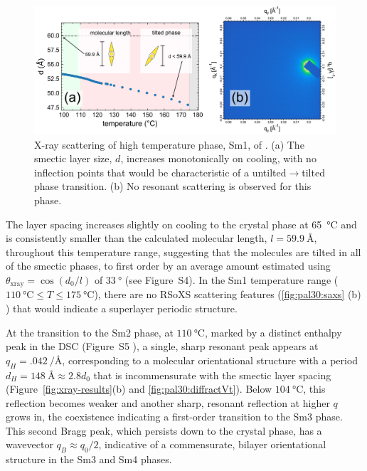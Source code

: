 \documentclass[aagreenthesis]{subfiles}
\begin{document}
\begin{figure}[h!]
    \centering
    \includegraphics[width=\textwidth]{figs/pal30/xraysm1/sm1-xray-annote.png}
    \caption{\label{fig:pal30:saxs} X-ray scattering of high temperature phase,
        Sm1, of \smcpalpha{}. (a) The smectic layer
    size, $d$, increases monotonically on cooling, with no inflection points
that would be characteristic of a untilted$\rightarrow$tilted phase transition.
(b) No resonant scattering is observed for this phase.}
\end{figure}


The layer spacing increases slightly on cooling
to the crystal phase at \SI{65}{\degreeCelsius} and is
consistently smaller than the calculated molecular length, $l = \SI{59.9}{\angstrom}$, throughout this temperature range, suggesting that the molecules are tilted in all of the smectic phases, to first order by an average amount estimated using $\theta_\textrm{xray} =
\cos(d_0/l)$ of $\SI{33}{\degree}$ (see Figure~S4).
In the Sm1 temperature range ($\SI{110}{\degreeCelsius} \leq T \leq
\SI{175}{\degreeCelsius}$), there are no RSoXS scattering features
(\autoref{fig:pal30:saxs} (b) ) that would indicate a
superlayer periodic structure.

At the transition to the Sm2 phase, at $\SI{110}{\degreeCelsius}$, marked  by
a distinct enthalpy peak in the DSC (Figure~S5
), a single, sharp
resonant peak appears at $q_H = \SI[per-mode=reciprocal]{.042}{\per\angstrom}$, corresponding
to a molecular orientational structure with a period
$d_H=\SI{148}{\angstrom}\approx 2.8 d_0$ that is incommensurate with the
smectic layer spacing (Figure~\ref{fig:xray-results}(b) and
\autoref{fig:pal30:diffractVt}). Below
$\SI{104}{\degreeCelsius}$, this reflection
becomes weaker and another sharp, resonant reflection at higher $q$ grows in, the coexistence
indicating a first-order transition to the Sm3 phase.
This second Bragg peak, which persists down to the crystal phase, has a
wavevector $q_B\approx q_0/2$, indicative of a commensurate, bilayer orientational
structure in the Sm3 and Sm4 phases.
%
\end{document}
